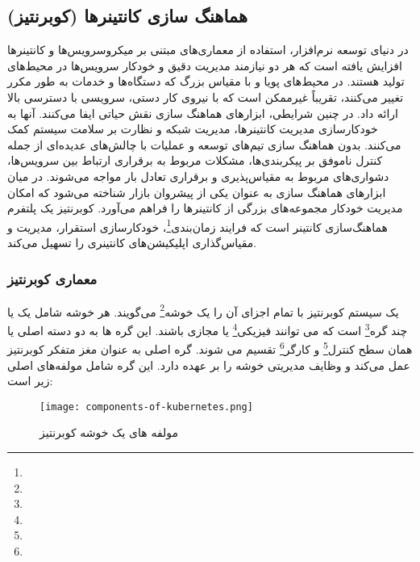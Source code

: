 \subsection{هماهنگ سازی کانتینرها (کوبرنتیز)}

در دنیای توسعه نرم‌افزار، استفاده از معماری‌های مبتنی بر میکروسرویس‌ها و کانتینرها افزایش یافته است که هر دو نیازمند مدیریت دقیق و خودکار سرویس‌ها در محیط‌های تولید هستند. در محیط‌های پویا و با مقیاس بزرگ که دستگاه‌ها و خدمات به طور مکرر تغییر می‌کنند، تقریباً غیرممکن است که با نیروی کار دستی، سرویسی با دسترسی بالا ارائه داد. در چنین شرایطی، ابزارهای هماهنگ سازی نقش حیاتی ایفا می‌کنند. آنها به خودکارسازی مدیریت کانتینرها، مدیریت شبکه و نظارت بر سلامت سیستم کمک می‌کنند. بدون هماهنگ سازی تیم‌های توسعه و عملیات با چالش‌های عدیده‌ای از جمله کنترل ناموفق بر پیکربندی‌ها، مشکلات مربوط به برقراری ارتباط بین سرویس‌ها، دشواری‌های مربوط به مقیاس‌پذیری و برقراری تعادل بار مواجه می‌شوند. در میان ابزارهای هماهنگ سازی  به عنوان یکی از پیشروان بازار شناخته می‌شود که امکان مدیریت خودکار مجموعه‌های بزرگی از کانتینرها را فراهم می‌آورد. کوبرنتیز یک پلتفرم هماهنگ‌سازی کانتینر است که فرایند زمان‌بندی\footnote{}، خودکارسازی استقرار، مدیریت و مقیاس‌گذاری اپلیکیشن‌های کانتینری را تسهیل می‌کند.

\subsubsection{معماری کوبرنتیز}
یک سیستم کوبرنتیز با تمام اجزای آن را یک خوشه\footnote{} می‌گویند. هر خوشه شامل یک یا چند گره\footnote{} است که می توانند فیزیکی\footnote{} یا مجازی باشند. این گره ها به دو دسته اصلی یا همان سطح کنترل\footnote{} و کارگر\footnote{} تقسیم می شوند.
گره اصلی به عنوان مغز متفکر کوبرنتیز عمل می‌کند و وظایف مدیریتی خوشه را بر عهده دارد. این گره شامل مولفه‌های اصلی زیر است:

\begin{figure}[t]
	\centering
	\texttt{[image: components-of-kubernetes.png]}
	\caption{مولفه های یک خوشه کوبرنتیز}
	\label{fig: components of kuber}
\end{figure}

